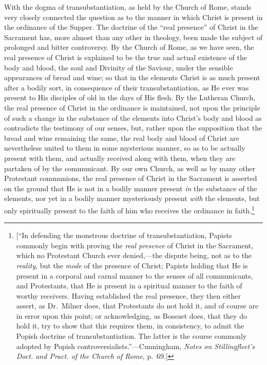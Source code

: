 \documentclass[english,]{book}
\begin{document}
With the dogma of transubstantiation, as held by the Church of Rome, stands very closely connected the question as to the manner in which Christ is present in the ordinance of the Supper. The doctrine of the ``real presence'' of Christ in the Sacrament has, more almost than any other in theology, been made the subject of prolonged and bitter controversy. By the Church of Rome, as we have seen, the real presence of Christ is explained to be the true and actual existence of the body and blood, the soul and Divinity of the Saviour, under the sensible appearances of bread and wine; so that in the elements Christ is as much present after a bodily sort, in consequence of their transubstantiation, as He ever was present to His disciples of old in the days of His flesh. By the Lutheran Church, the real presence of Christ in the ordinance is maintained, not upon the principle of such a change in the substance of the elements into Christ's body and blood as contradicts the testimony of our senses, but, rather upon the supposition that the bread and wine remaining the same, the real body and blood of Christ are nevertheless united to them in some mysterious manner, so as to be actually present with them, and actually received along with them, when they are partaken of by the communicant. By our own Church, as well as by many other Protestant communions, the real presence of Christ in the Sacrament is asserted on the ground that He is not in a bodily manner present \emph{in} the substance of the elements, nor yet in a bodily manner mysteriously present \emph{with} the elements, but only spiritually present to the faith of him who receives the ordinance in faith.\footnote{{[}``In defending the monstrous doctrine of transubstantiation, Papists commonly begin with proving the \emph{real presence} of Christ in the Sacrament, which no Protestant Church ever denied,---the dispute being, not as to the \emph{reality}, but the \emph{mode} of the presence of Christ; Papists holding that He is present in a corporal and carnal manner to the senses of all communicants, and Protestants, that He is present in a spiritual manner to the faith of worthy receivers. Having established the real presence, they then either assert, as Dr.~Milner does, that Protestants do not hold it, and of course are in error upon this point; or acknowledging, as Bossuet does, that they do hold it, try to show that this requires them, in consistency, to admit the Popish doctrine of transubstantiation. The latter is the course commonly adopted by Popish controversialists.''---Cunningham, \emph{Notes on Stillingfleet's Doct. and Pract. of the Church of Rome}, p.~69.{]}}
\end{document}
